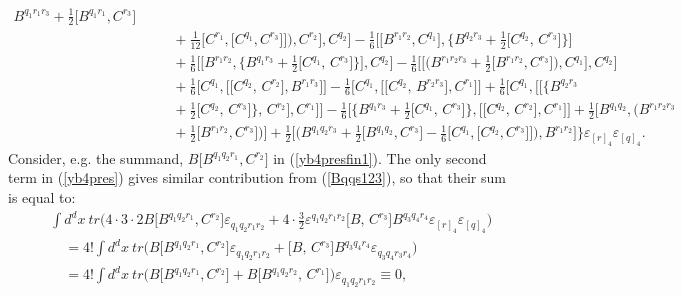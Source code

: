 \documentclass[10pt]{article}
\begin{document}
\begin{eqnarray}
  {B}^{q_1r_1r_3}+ \textstyle\frac{1}{2}
\big[B^{q_1r_1}, C^{r_3}\big]
\nonumber \\
&& \quad   +\textstyle\frac{1}{12}\big[C^{r_1},\big[C^{q_1},C^{r_3}\big]\big]\Big)
,C^{r_2}\Big],C^{q_2}\Big]
- \textstyle\frac{1}{6}\big[\big[B^{r_1r_2},C^{q_1}\big],
\big\{B^{q_2r_3}+\frac{1}{2}\big[C^{q_2},\,C^{r_3}\big]\big\}
\big]  \nonumber \\
&& \quad +\textstyle\frac{1}{6}\big[\big[B^{r_1r_2}, \big\{B^{q_1r_3}+\frac{1}{2}\big[C^{q_1},\,C^{r_3}\big]\big\}\big],C^{q_2}\big] - \textstyle\frac{1}{6}\Big[\Big[\Big(
 {B}^{r_1r_2r_3}+ \textstyle\frac{1}{2}
\big[B^{r_1r_2}, C^{r_3}\big] \Big)
,C^{q_1}\Big],C^{q_2}\Big] \nonumber \\
&& \quad+\textstyle\frac{1}{6}\big[C^{q_1},\big[\big[C^{q_2},\,C^{r_2}\big] , B^{r_1r_3}\big]\big]-\textstyle\frac{1}{6}\big[C^{q_1},\big[\big[C^{q_2},\,B^{r_2r_3}\big] , C^{r_1}\big]\big]
 +\textstyle\frac{1}{6}\big[C^{q_1},\big[\big[
 \big\{B^{q_2r_3}  \nonumber \\
&& \quad
 +\textstyle\frac{1}{2}\big[C^{q_2},\,C^{r_3}\big]\big\},\,C^{r_2}\big] , C^{r_1}\big]\big]
-\textstyle\frac{1}{6}\big[\big\{B^{q_1r_3}+\frac{1}{2}\big[C^{q_1},\,C^{r_3}\big]\big\},\big[\big[C^{q_2},\,C^{r_2}\big] , C^{r_1}\big]\big]  +
 \textstyle\frac{1}{2}
\Big[B^{q_1q_2},  \Big(
 {B}^{r_1r_2r_3} \nonumber \\
&& \quad+ \textstyle\frac{1}{2}
\big[B^{r_1r_2}, C^{r_3}\big] \Big)\Big] +
 \textstyle\frac{1}{2}
\big[\Big(
 {B}^{q_1q_2r_3}+ \textstyle\frac{1}{2}
\big[B^{q_1q_2}, C^{r_3}\big] -\frac{1}{6}\big[C^{q_1},\big[C^{q_2},C^{r_3}\big]\big]\Big), B^{r_1r_2}\big]\Bigg\}\varepsilon_{[r]_4}\varepsilon_{[q]_4}. \label{Bqqs123}
\end{eqnarray}
Consider,  e.g.  the summand, $B \big[B^{q_1q_2r_1},C^{r_2}\big]$ in (\ref{yb4presfin1}). The only  second  term in   (\ref{yb4pres}) gives similar contribution from (\ref{Bqqs123}), so that their sum is equal to:
 \begin{eqnarray}\label{BBqqrC}
   && \int d^dx \ tr   \Big( 4 \cdot 3 \cdot 2  B \big[B^{q_1q_2r_1},C^{r_2}\big] \varepsilon_{q_1q_2r_1r_2}  +  4 \cdot \textstyle\frac{3}{2} \varepsilon^{q_1q_2r_1r_2} \big[B,\,C^{r_3}\big]B^{q_3q_4r_4} \varepsilon_{[r]_4}\varepsilon_{[q]_4}\Big)   \nonumber \\
   && \quad = 4! \int d^dx \ tr   \Big(   B \big[B^{q_1q_2r_1},C^{r_2}\big] \varepsilon_{q_1q_2r_1r_2}   +    \big[B,\,C^{r_3}\big]B^{q_3q_4r_4} \varepsilon_{q_3q_4r_3r_4}\Big)  \\
   && \quad  = 4! \int d^dx \ tr   \Big(   B \big[B^{q_1q_2r_1},C^{r_2}\big]    +    B\big[B^{q_1q_2r_2},\,C^{r_1}\big] \Big) \varepsilon_{q_1q_2r_1r_2} \equiv  0, \nonumber
 \end{eqnarray}
\end{document}
